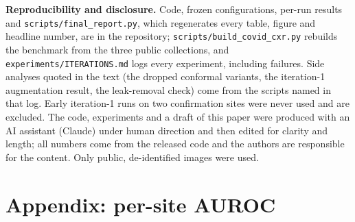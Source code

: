 \documentclass[10pt]{article}
\begin{document}
\textbf{Reproducibility and disclosure.} Code, frozen configurations, per-run results and \texttt{scripts/\allowbreak final\_report.py}, which regenerates every table, figure and headline number, are in the repository; \texttt{scripts/\allowbreak build\_covid\_cxr.py} rebuilds the benchmark from the three public collections, and \texttt{experiments/\allowbreak ITERATIONS.md} logs every experiment, including failures. Side analyses quoted in the text (the dropped conformal variants, the iteration-1 augmentation result, the leak-removal check) come from the scripts named in that log. Early iteration-1 runs on two confirmation sites were never used and are excluded. The code, experiments and a draft of this paper were produced with an AI assistant (Claude) under human direction and then edited for clarity and length; all numbers come from the released code and the authors are responsible for the content. Only public, de-identified images were used.

{\small

}

\appendix
\section*{Appendix: per-site AUROC}
\begin{table}[H]\centering\scriptsize
\resizebox{\linewidth}{!}{}
\caption{Held-out AUROC per site (two-seed mean); d = development fold, c = confirmation fold.}\label{tab:perfold}
\end{table}
\end{document}
